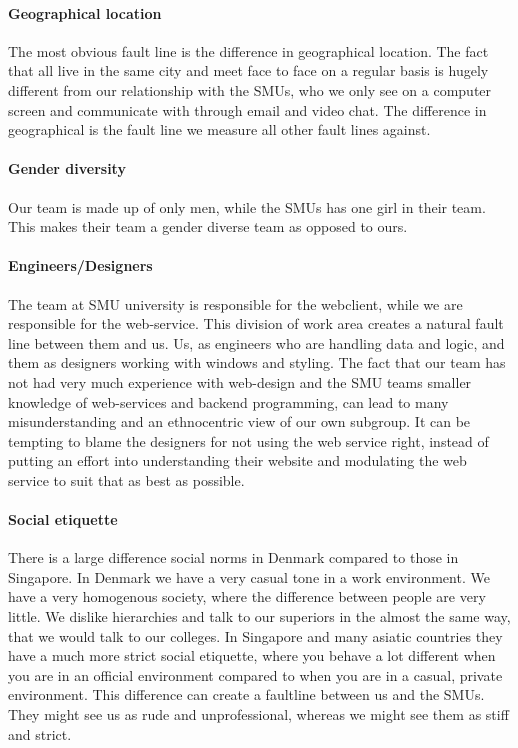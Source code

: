 \documentclass[a4paper,11pt,report]{article}
\begin{document}
{\paragraph{Geographical location}
The most obvious fault line is the difference in geographical location. The fact that all live in the same city and meet face to face on a regular basis is hugely different from our relationship with the SMUs, who we only see on a computer screen and communicate with through email and video chat. The difference in geographical is the fault line we measure all other fault lines against.

\paragraph{Gender diversity}
Our team is made up of only men, while the SMUs has one girl in their team. This makes their team a gender diverse team as opposed to ours.

\paragraph{Engineers/Designers}
The team at SMU university is responsible for the webclient, while we are responsible for the web-service. This division of work area creates a natural fault line between them and us. Us, as engineers who are handling data and logic, and them as designers working with windows and styling. The fact that our team has not had very much experience with web-design and the SMU teams smaller knowledge of web-services and backend programming, can lead to many misunderstanding and an ethnocentric view of our own subgroup. It can be tempting to blame the designers for not using the web service right, instead of putting an effort into understanding their website and modulating the web service to suit that as best as possible.

\paragraph{Social etiquette}
There is a large difference social norms in Denmark compared to those in Singapore. In Denmark we have a very casual tone in a work environment. We have a very homogenous society, where the difference between people are very little. We dislike hierarchies and talk to our superiors in the almost the same way, that we would talk to our colleges. In Singapore and many asiatic countries they have a much more strict social etiquette, where you behave a lot different when you are in an official environment compared to when you are in a casual, private environment. This difference can create a faultline between us and the SMUs. They might see us as rude and unprofessional, whereas we might see them as stiff and strict. 

}
\end{document}
